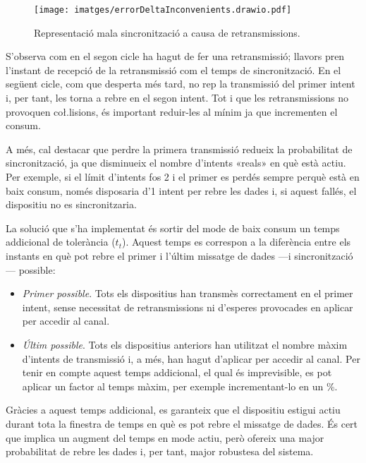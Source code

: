 \documentclass{tfgitic}[2024/07/01]
\begin{document}
{\begin{figure}
    \centering
    \texttt{[image: imatges/errorDeltaInconvenients.drawio.pdf]}
    \caption{Representació mala sincronització a causa de retransmissions.}
    \label{fig:syncDeltaTimeErr}
\end{figure}

S'observa com en el segon cicle  ha hagut de fer una retransmissió; llavors  pren l'instant de recepció de la retransmissió com el temps de sincronització. En el següent cicle, com que desperta més tard, no rep la transmissió del primer intent i, per tant, les torna a rebre en el segon intent. Tot i que les retransmissions no provoquen co\l.lisions, és important reduir-les al mínim ja que incrementen el consum. 

A més, cal destacar que perdre la primera transmissió redueix la probabilitat de sincronització, ja que disminueix el nombre d'intents «reals» en què  està actiu. Per exemple, si el límit d'intents fos 2 i el primer es perdés sempre perquè està en baix consum, només disposaria d'1 intent per rebre les dades i, si aquest fallés, el dispositiu no es sincronitzaria.

La solució que s'ha implementat és sortir del mode de baix consum un temps addicional de tolerància ($t_t$). Aquest temps es correspon a la diferència entre els instants en què pot rebre el primer i l'últim missatge de dades ---i sincronització--- possible:
\begin{itemize}
    \item \emph{Primer possible}. Tots els dispositius han transmès correctament en el primer intent, sense necessitat de retransmissions ni d'esperes provocades en aplicar  per accedir al canal. 
    \item \emph{Últim possible}. Tots els dispositius anteriors han utilitzat el nombre màxim d'intents de transmissió i, a més, han hagut d'aplicar  per accedir al canal. Per tenir en compte aquest temps addicional, el qual és imprevisible, es pot aplicar un factor al temps màxim, per exemple incrementant-lo en un 
    \%.
\end{itemize} 

Gràcies a aquest temps addicional, es garanteix que el dispositiu estigui actiu durant tota la finestra de temps en què es pot rebre el missatge de dades. És cert que implica un augment del temps en mode actiu, però ofereix una major probabilitat de rebre les dades i, per tant, major robustesa del sistema. 


}
\end{document}

